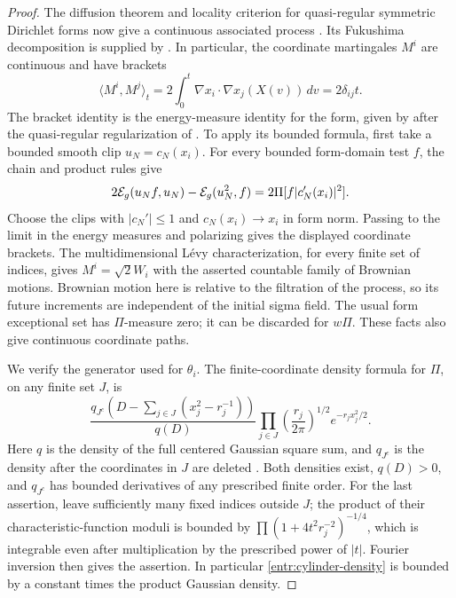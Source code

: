 \begin{proof}
The diffusion theorem and locality criterion for quasi-regular
symmetric Dirichlet forms now give a continuous associated process
\cite[Theorems~IV.3.5 and V.1.11]{MaRockner}.  Its Fukushima
decomposition is supplied by \cite[Theorem~VI.2.5]{MaRockner}.
In particular, the coordinate martingales \(M^i\) are continuous and
have brackets
\[
 \langle M^i,M^j\rangle_t
   =2\int_0^t \nabla x_i\cdot\nabla x_j(X(v))\,dv
   =2\delta_{ij}t.
\]
The bracket identity is the energy-measure identity for the form,
given by \cite[Theorem~5.2.3 and Equation~(5.2.34)]{FOT} after the
quasi-regular regularization of \cite[Chapter~VI]{MaRockner}.
To apply its bounded formula, first take a bounded smooth clip
\(u_N=c_N(x_i)\).  For every bounded form-domain test \(f\), the chain
and product rules give
\[
 2\mathcal E_g(u_Nf,u_N)-\mathcal E_g(u_N^2,f)
       =2\Pi[f|c_N'(x_i)|^2].
\]
Choose the clips with \(|c_N'|\le1\) and \(c_N(x_i)\to x_i\) in form
norm.  Passing to the limit in the energy measures and polarizing gives
the displayed coordinate brackets.
The multidimensional Lévy characterization, for every finite set of
indices, gives \(M^i=\sqrt2W_i\) with the asserted countable family of
Brownian motions.  Brownian motion here is relative to the filtration of
the process, so its future increments are independent of the initial
sigma field.  The usual form exceptional set has \(\Pi\)-measure zero;
it can be discarded for \(w\Pi\).  These facts also give continuous
coordinate paths.

We verify the generator used for \(\theta_i\).  The finite-coordinate
density formula for \(\Pi\), on any finite set \(J\), is
\begin{equation}\label{entr:cylinder-density}
 \frac{q_{J^c}\!\left(D-\sum_{j\in J}(x_j^2-r_j^{-1})\right)}
      {q(D)}
 \prod_{j\in J}\left(\frac{r_j}{2\pi}\right)^{1/2}
                     e^{-r_jx_j^2/2}.
\end{equation}
Here \(q\) is the density of the full centered Gaussian square sum,
and \(q_{J^c}\) is the density after the coordinates in \(J\) are
deleted
\cite[Proposition~2.3]{FUA}.
Both densities exist, \(q(D)>0\), and \(q_{J^c}\) has bounded
derivatives of any prescribed finite order.  For the last assertion,
leave sufficiently many fixed indices outside \(J\); the product of
their characteristic-function moduli is bounded by
\(\prod (1+4t^2r_j^{-2})^{-1/4}\), which is integrable even after
multiplication by the prescribed power of \(|t|\).  Fourier inversion
then gives the assertion.  In particular \eqref{entr:cylinder-density}
is bounded by a constant times the product Gaussian density.


\end{proof}
